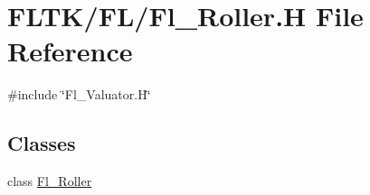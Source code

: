 \hypertarget{_fl___roller_8_h}{}\section{F\+L\+T\+K/\+F\+L/\+Fl\+\_\+\+Roller.H File Reference}
\label{_fl___roller_8_h}
{\ttfamily \#include \char`\"{}Fl\+\_\+\+Valuator.\+H\char`\"{}}\newline
\subsection*{Classes}
\begin{DoxyCompactItemize}
\item 
class \hyperlink{class_fl___roller}{Fl\+\_\+\+Roller}
\end{DoxyCompactItemize}
